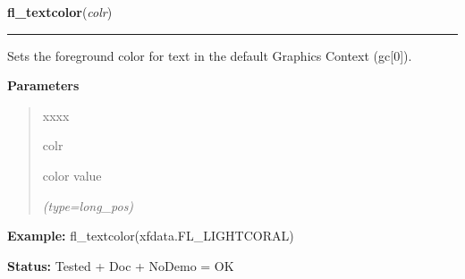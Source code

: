 \hspace{.8\funcindent}\begin{boxedminipage}{\funcwidth}

    \raggedright \textbf{fl\_textcolor}(\textit{colr})

    \vspace{-1.5ex}

    \rule{\textwidth}{0.5\fboxrule}
\setlength{\parskip}{2ex}
    Sets the foreground color for text in the default Graphics Context 
    (gc[0]).

\setlength{\parskip}{1ex}
      \textbf{Parameters}
      \vspace{-1ex}

      \begin{quote}
        \begin{Ventry}{xxxx}

          \item[colr]

          color value

            {\it (type=long\_pos)}

        \end{Ventry}

      \end{quote}

\textbf{Example:} fl\_textcolor(xfdata.FL\_LIGHTCORAL)



\textbf{Status:} Tested + Doc + NoDemo = OK



    \end{boxedminipage}

    \label{xformslib:flbasic:fl_bk_textcolor}

    \vspace{0.5ex}


